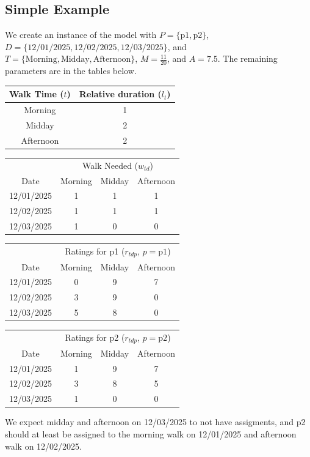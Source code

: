 \documentclass{notes}
\begin{document}
\subsection*{Simple Example}
We create an instance of the model with $P=\{\text{p1},\text{p2}\}$,\newline $D=\{\text{12/01/2025},\text{12/02/2025},\text{12/03/2025}\}$, and $T=\{\text{Morning},\text{Midday},\text{Afternoon}\}$, $M=\frac{11}{20}$, and $A=7.5$. The remaining parameters are in the tables below.\\
\begin{center}
	\begin{tabular}{c|c}
		Walk Time ($t$) & Relative duration ($l_t$)\\
		\hline
		Morning & 1\\
		Midday & 2\\
		Afternoon & 2
	\end{tabular}

	\vspace{1em}

	\begin{tabular}{c|ccc}
		& \multicolumn{3}{c}{Walk Needed ($w_{td}$)}\\
		Date & Morning & Midday & Afternoon\\
		\hline
		12/01/2025 & 1 & 1 & 1\\
		12/02/2025 & 1 & 1 & 1\\
		12/03/2025 & 1 & 0 & 0
	\end{tabular}

	\vspace{1em}

	\begin{tabular}{c|ccc}
		& \multicolumn{3}{c}{Ratings for p1 ($r_{tdp}$, $p=\text{p1}$)}\\
		Date & Morning & Midday & Afternoon\\
		\hline
		12/01/2025 & 0 & 9 & 7\\
		12/02/2025 & 3 & 9 & 0\\
		12/03/2025 & 5 & 8 & 0
	\end{tabular}\qquad
	\begin{tabular}{c|ccc}
		& \multicolumn{3}{c}{Ratings for p2 ($r_{tdp}$, $p=\text{p2}$)}\\
		Date & Morning & Midday & Afternoon\\
		\hline
		12/01/2025 & 1 & 9 & 7\\
		12/02/2025 & 3 & 8 & 5\\
		12/03/2025 & 1 & 0 & 0
	\end{tabular}
\end{center}
We expect midday and afternoon on 12/03/2025 to not have assigments, and p2 should at least be assigned to the morning walk on 12/01/2025 and afternoon walk on 12/02/2025.\\
\end{document}

